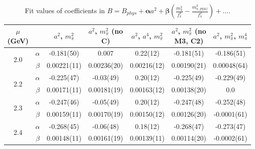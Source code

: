 \documentclass[12pt]{extarticle}
\begin{document}
\begin{table}[h!]
\begin{center}
\begin{tabular}{|c c|c|c|c|c|c|}
\hline
$\mu$ (GeV) &  & $a^2$, $m_\pi^2$& $a^2$, $m_\pi^2$ (no C)& $a^2$, $a^4$, $m_\pi^2$& $a^2$, $m_\pi^2$ (no M3, C2)& $a^2$, $m_\pi^2$, $m_\pi^4$\\
\hline
\multirow{2}{0.5in}{2.0} & $\alpha$ & -0.181(50)& 0.007& 0.22(12)& -0.181(51)& -0.186(51)\\
 & $\beta$ & 0.00221(11)& 0.00236(20)& 0.00216(12)& 0.00190(21)& 0.00048(64)\\
\hline
\multirow{2}{0.5in}{2.2} & $\alpha$ & -0.225(47)& -0.03(49)& 0.20(12)& -0.225(49)& -0.229(49)\\
 & $\beta$ & 0.00171(11)& 0.00181(19)& 0.00163(12)& 0.00138(20)& 0.0\\
\hline
\multirow{2}{0.5in}{2.3} & $\alpha$ & -0.247(46)& -0.05(49)& 0.20(12)& -0.247(48)& -0.252(48)\\
 & $\beta$ & 0.00159(11)& 0.00170(19)& 0.00150(12)& 0.00126(20)& -0.0001(61)\\
\hline
\multirow{2}{0.5in}{2.4} & $\alpha$ & -0.268(45)& -0.06(48)& 0.18(12)& -0.268(47)& -0.273(47)\\
 & $\beta$ & 0.00148(11)& 0.00161(19)& 0.00139(11)& 0.00114(20)& -0.0002(61)\\
\hline
\end{tabular}
\caption{Fit values of coefficients in $B = B_{phys} + \mathbf{\alpha} a^2 + \mathbf{\beta}\left(\frac{m_\pi^2}{f_\pi^2}-\frac{m_{\pi,PDG}^2}{f_\pi^2}\right) + \ldots$.}
\end{center}
\end{table}




















\clearpage
\end{document}
